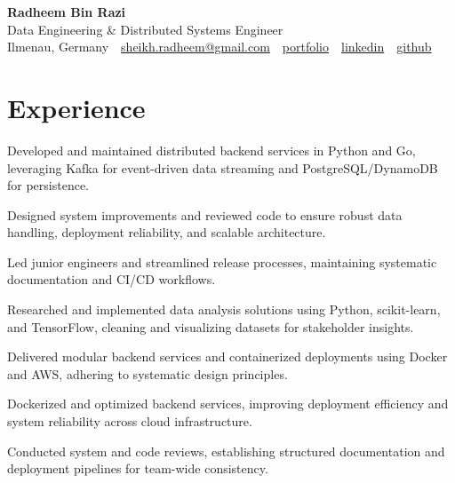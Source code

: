 \documentclass[11pt,a4paper]{resume}
\makeatletter
\newcommand{\Portfolio}{https://radheem.github.io/my-cv}
\newcommand{\PortfolioText}{portfolio}
\newcommand{\GitHub}{https://github.com/radheem}
\newcommand{\LinkedIn}{https://www.linkedin.com/in/radheem-razi}
\newcommand{\Email}{sheikh.radheem@gmail.com}
\makeatother
\begin{document}
\begin{center}
  {\huge\bfseries Radheem Bin Razi}\\[3pt]
  {\large Data Engineering \& Distributed Systems Engineer}\\[6pt]
  \small
  Ilmenau, Germany \,\textbar\,
  \href{mailto:\Email}{\Email} \,\textbar\,
  \href{\Portfolio}{\PortfolioText} \,\textbar\,
  \href{\LinkedIn}{linkedin} \,\textbar\,
  \href{\GitHub}{github}
\end{center}
\vspace{2pt}

\section{Experience}

\bullets
  \item Developed and maintained distributed backend services in Python and Go, leveraging Kafka for event-driven data streaming and PostgreSQL/DynamoDB for persistence.
  \item Designed system improvements and reviewed code to ensure robust data handling, deployment reliability, and scalable architecture.
  \item Led junior engineers and streamlined release processes, maintaining systematic documentation and CI/CD workflows.
\bulletsend
\vspace{3pt}
\bullets
  \item Researched and implemented data analysis solutions using Python, scikit-learn, and TensorFlow, cleaning and visualizing datasets for stakeholder insights.
  \item Delivered modular backend services and containerized deployments using Docker and AWS, adhering to systematic design principles.
\bulletsend
\vspace{3pt}
\bullets
  \item Dockerized and optimized backend services, improving deployment efficiency and system reliability across cloud infrastructure.
  \item Conducted system and code reviews, establishing structured documentation and deployment pipelines for team-wide consistency.
\bulletsend
\vspace{3pt}
\end{document}
